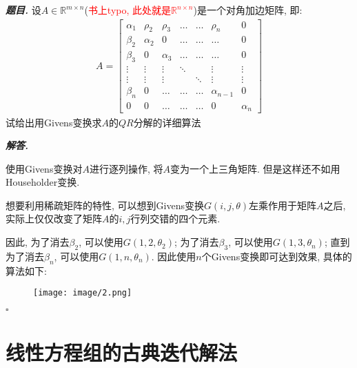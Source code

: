 \documentclass[10pt, a4paper, oneside]{ctexart}
\newenvironment{problem}{\begin{framed}\par\noindent\textbf{\textit{题目. }}}{\end{framed}\par}
\newenvironment{solution}{%
  \par\noindent\textbf{\textit{解答. }}\ignorespaces
}{%
  \hfill\ensuremath{\square}\par %
}
\begin{document}
\begin{problem}
    设$A\in \mathbb{R}^{m\times n}$(\textcolor{red}{书上typo, 此处就是$\mathbb{R}^{n\times n}$})是一个对角加边矩阵, 即:
    \begin{align*}
        A = \begin{bmatrix}
            \alpha_1 & \rho_2 & \rho_3 & \dots & \dots & \rho_n & 0 \\
            \beta_2 & \alpha_2 & 0 & \dots & \dots & \dots & 0 \\
            \beta_3 & 0 & \alpha_3 & \dots & \dots & \dots & 0 \\
            \vdots & \vdots & \vdots & \ddots & & \vdots & \vdots \\
            \vdots & \vdots & \vdots & & \ddots & \vdots & \vdots \\
            \beta_n & 0 & \dots & \dots & \dots & \alpha_{n-1} & 0 \\
            0 & 0 & \dots & \dots & \dots & 0 & \alpha_n
            \end{bmatrix}
    \end{align*}
    试给出用Givens变换求$A$的$QR$分解的详细算法
\end{problem}
\begin{solution}
使用Givens变换对$A$进行逐列操作, 将$A$变为一个上三角矩阵. 但是这样还不如用Householder变换.

想要利用稀疏矩阵的特性, 可以想到Givens变换$G(i,j,\theta)$左乘作用于矩阵$A$之后, 实际上仅仅改变了矩阵$A$的$i,j$行列交错的四个元素.

因此, 为了消去$\beta_2$, 可以使用$G(1,2,\theta_2)$; 为了消去$\beta_3$, 可以使用$G(1,3,\theta_n)$; 直到为了消去$\beta_n$, 可以使用$G(1,n,\theta_n)$. 因此使用$n$个Givens变换即可达到效果, 具体的算法如下:
\begin{figure}[h]
    \centering
    \texttt{[image: image/2.png]}
\end{figure}
\end{solution}

\section{线性方程组的古典迭代解法}
\end{document}
